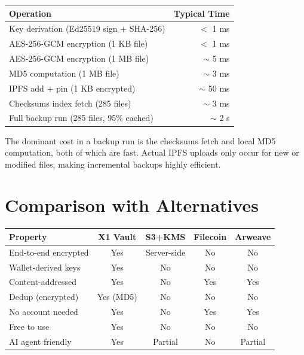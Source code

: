 \documentclass[11pt,a4paper]{article}
\begin{document}
\begin{center}
\begin{tabularx}{0.85\textwidth}{Xr}
\hline
\textbf{Operation} & \textbf{Typical Time} \\
\hline
Key derivation (Ed25519 sign + SHA-256) & $<$ 1 ms \\
AES-256-GCM encryption (1 KB file) & $<$ 1 ms \\
AES-256-GCM encryption (1 MB file) & $\sim$ 5 ms \\
MD5 computation (1 MB file) & $\sim$ 3 ms \\
IPFS add + pin (1 KB encrypted) & $\sim$ 50 ms \\
Checksums index fetch (285 files) & $\sim$ 3 ms \\
Full backup run (285 files, 95\% cached) & $\sim$ 2 s \\
\hline
\end{tabularx}
\end{center}

The dominant cost in a backup run is the checksums fetch and local MD5 computation, both of which are fast. Actual IPFS uploads only occur for new or modified files, making incremental backups highly efficient.

\section{Comparison with Alternatives}

\begin{center}
\begin{tabularx}{\textwidth}{lcccc}
\hline
\textbf{Property} & \textbf{X1 Vault} & \textbf{S3+KMS} & \textbf{Filecoin} & \textbf{Arweave} \\
\hline
End-to-end encrypted & Yes & Server-side & No & No \\
Wallet-derived keys & Yes & No & No & No \\
Content-addressed & Yes & No & Yes & Yes \\
Dedup (encrypted) & Yes (MD5) & No & No & No \\
No account needed & Yes & No & Yes & Yes \\
Free to use & Yes & No & No & No \\
AI agent friendly & Yes & Partial & No & Partial \\
\hline
\end{tabularx}
\end{center}
\end{document}
